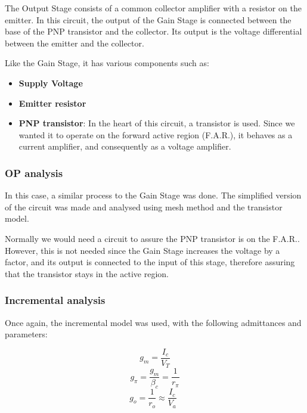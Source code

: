The Output Stage consists of a common collector amplifier with a resistor on the emitter. In this circuit, the output of the Gain Stage is connected between the base of the PNP transistor and the collector. Its output is the voltage differential between the emitter and the collector.

Like the Gain Stage, it has various components such as:

\begin{itemize}
    \item \textbf{Supply Voltage}
    \item \textbf{Emitter resistor}
    \item \textbf{PNP transistor}: In the heart of this circuit, a transistor is used. Since we wanted it to operate on the forward active region (F.A.R.), it behaves as a current amplifier, and consequently as a voltage amplifier.
\end{itemize}



\subsubsection*{OP analysis}

\indent

In this case, a similar process to the Gain Stage was done.
The simplified version of the circuit was made and analysed using mesh method and the transistor model.

Normally we would need a circuit to assure the PNP transistor is on the F.A.R.. However, this is not needed since the Gain Stage increases the voltage by a factor, and its output is connected to the input of this stage, therefore assuring that the transistor stays in the active region.

\subsubsection*{Incremental analysis}

\indent

Once again, the incremental model was used, with the following admittances and parameters:

\begin{equation}
    g_m= \frac{I_c}{V_T}
\end{equation}
\begin{equation}
    g_{\pi}=\frac{g_m}{\beta_c}=\frac{1}{r_{\pi}}
\end{equation}
\begin{equation}
    g_o = \frac{1}{r_o} \approx \frac{I_c}{V_a} \hspace{5pt}
\end{equation}

